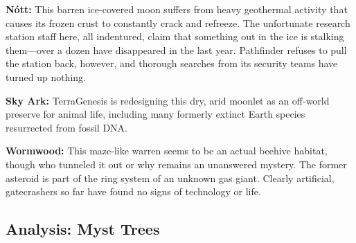 \textbf{Nótt:} This barren ice-covered moon suffers from 
heavy geothermal activity that causes its frozen crust to 
constantly crack and refreeze. The unfortunate research 
station staff here, all indentured, claim that something 
out in the ice is stalking them—over a dozen have disappeared
in the last year. Pathfinder refuses to pull the
station back, however, and thorough searches from its 
security teams have turned up nothing.

\textbf{Sky Ark:} TerraGenesis is redesigning this dry, arid 
moonlet as an off-world preserve for animal life, 
including many formerly extinct Earth species resurrected
from fossil DNA.

\textbf{Wormwood:} This maze-like warren seems to be an 
actual beehive habitat, though who tunneled it out 
or why remains an unanswered mystery. The former 
asteroid is part of the ring system of an unknown gas 
giant. Clearly artificial, gatecrashers so far have found 
no signs of technology or life.

\subsection{Analysis: Myst Trees}

